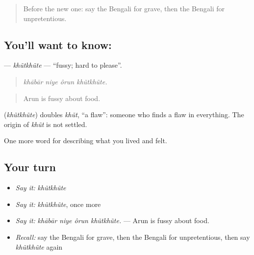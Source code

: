 \label{lesson:BN-C464-khutkhute}



\begin{quote}
Before the new one: say the Bengali for grave, then the Bengali for unpretentious.
\end{quote}

\subsection*{You'll want to know: }
\textbf{} — \emph{khũtkhũte} — \textquotedblleft{}fussy; hard to please\textquotedblright{}.

\begin{quote}
   
\end{quote}

\begin{quote}
\emph{khābār niye ôrun khũtkhũte.}
\end{quote}

\begin{quote}
Arun is fussy about food.
\end{quote}

\begin{cousinweb}
\textbf{} (\emph{khũtkhũte}) doubles \emph{khũt}, \textquotedblleft{}a flaw\textquotedblright{}: someone who finds a flaw in everything. The origin of \emph{khũt} is not settled.
\end{cousinweb}

\begin{grammarlens}[title={What you've built}]
One more word for describing what you lived and felt.
\end{grammarlens}

\subsection*{Your turn}
\begin{itemize}
\raggedright
  \item \emph{Say it:} \emph{khũtkhũte}
  \item \emph{Say it:} \emph{khũtkhũte}, once more
  \item \emph{Say it:} \emph{khābār niye ôrun khũtkhũte.} — Arun is fussy about food.
  \item \emph{Recall:} say the Bengali for grave, then the Bengali for unpretentious, then say \emph{khũtkhũte} again
\end{itemize}

